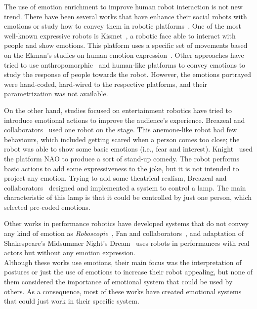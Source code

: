 The use of emotion enrichment to improve human robot interaction is not new trend. There have been several works that have enhance their social robots with emotions or study how to convey them in robotic platforms~\cite{Li2011,Brown2014}. One of the most well-known expressive robots is Kismet~\cite{Breazeal2002}, a robotic face able to interact with people and show emotions. This platform uses a specific set of movements based on the Ekman's studies on human emotion expression~\cite{Ekman2004}. Other approaches have tried to use anthropomorphic~\cite{Arras2012} and human-like platforms to convey emotions to study the response of people towards the robot. However, the emotions portrayed were hand-coded, hard-wired to the respective platforms, and their parametrization was not available.

On the other hand, studies focused on entertainment robotics have tried to introduce emotional actions to improve the audience's experience. Breazeal and collaborators~\cite{Breazeal2003} used one robot on the stage. This anemone-like robot had few behaviours, which included getting scared when a person comes too close; the robot was able to show some basic emotions (i.e., fear and interest). Knight~\cite{Knight2011b,Knight2010} used the platform NAO to produce a sort of stand-up comedy. The robot performs basic actions to add some expressiveness to the joke, but it is not intended to project any emotion. Trying to add some theatrical realism, Breazeal and collaborators~\cite{Breazeal2008} designed and implemented a system to control a lamp. The main characteristic of this lamp is that it could be controlled by just one person, which selected pre-coded emotions.

Other works in performance robotics have developed systems that do not convey any kind of emotion as \textit{Roboscopie}~\cite{Roboscopie2012,Lemaignan2012}, Fan and collaborators~\cite{Fan2009,Fan2013}, and adaptation of Shakespeare's  Midsummer Night's Dream~\cite{murphy2011} uses robots in performances with real actors but without any emotion expression.\\
Although these works use emotions, their main focus was the interpretation of postures or just the use of emotions to increase their robot appealing, but none of them considered the importance of emotional system that could be used by others. As a consequence, most of these works have created emotional systems that could just work in their specific system.